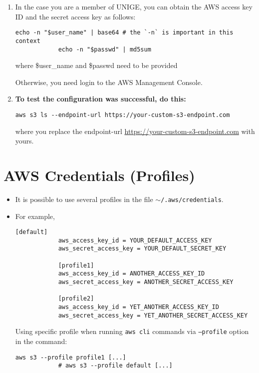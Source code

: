 \documentclass[12pt, a4paper]{scrbook}
\numberwithin{equation}{section}
\theoremstyle{definition}
\theoremstyle{definition}
\begin{document}
\begin{enumerate}
		\item In the case you are a member of UNIGE, you can obtain the AWS access key ID and the secret access key as follows:
		
		\begin{lstlisting}[style=mystylebash, label=alg:aws__access_secret_key, xleftmargin=\parindent]
			echo -n "$user_name" | base64 # the `-n` is important in this context
			echo -n "$passwd" | md5sum
		\end{lstlisting}
		
		where \$user\_name and \$passwd need to be provided
		
		Otherwise, you need login to the AWS Management Console. 
		
		\item \textbf{To test the configuration was successful, do this:}
		
		\begin{lstlisting}[style=mystylebash, label=alg:aws_configure_test, xleftmargin=\parindent]
			aws s3 ls --endpoint-url https://your-custom-s3-endpoint.com
		\end{lstlisting}
		
		where you replace the endpoint-url \url{https://your-custom-s3-endpoint.com} with yours.
		
	\end{enumerate}
	
	\section{AWS Credentials (Profiles)}
	
	\begin{itemize}
		\item It is possible to use several profiles in the file \texttt{$\sim$/.aws/credentials}. 
		
		\item For example,
		
		\begin{lstlisting}[style=mystylebash, label=alg:aws_profiles, xleftmargin=\parindent]
			[default]
			aws_access_key_id = YOUR_DEFAULT_ACCESS_KEY
			aws_secret_access_key = YOUR_DEFAULT_SECRET_KEY
			
			[profile1]                                                                   
			aws_access_key_id = ANOTHER_ACCESS_KEY_ID
			aws_secret_access_key = ANOTHER_SECRET_ACCESS_KEY
			
			[profile2]
			aws_access_key_id = YET_ANOTHER_ACCESS_KEY_ID
			aws_secret_access_key = YET_ANOTHER_SECRET_ACCESS_KEY
		\end{lstlisting}
		
		Using specific profile when running \texttt{aws cli} commands via \texttt{--profile} option in the command:
		
		\begin{lstlisting}[style=mystylebash, label=alg:aws_cli__profile, xleftmargin=\parindent]
			aws s3 --profile profile1 [...]
			# aws s3 --profile default [...]
		\end{lstlisting}
		
	\end{itemize}
	
\end{document}
